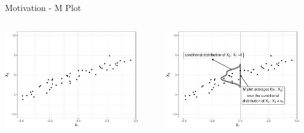 \documentclass[11pt,compress,t,notes=noshow, aspectratio=169, xcolor=table]{beamer}
\begin{document}
\begin{frame}{Motivation - M Plot}

\begin{columns}[T]
\begin{column}{0.5\textwidth}
\centering
\includegraphics[width=0.9\textwidth]{figure/ale_scatter}
\end{column}
\begin{column}{0.5\textwidth}
\centering
\includegraphics[width=0.9\textwidth]{figure/ale_mplot}
\end{column}
\end{columns}



\end{frame}
\end{document}
